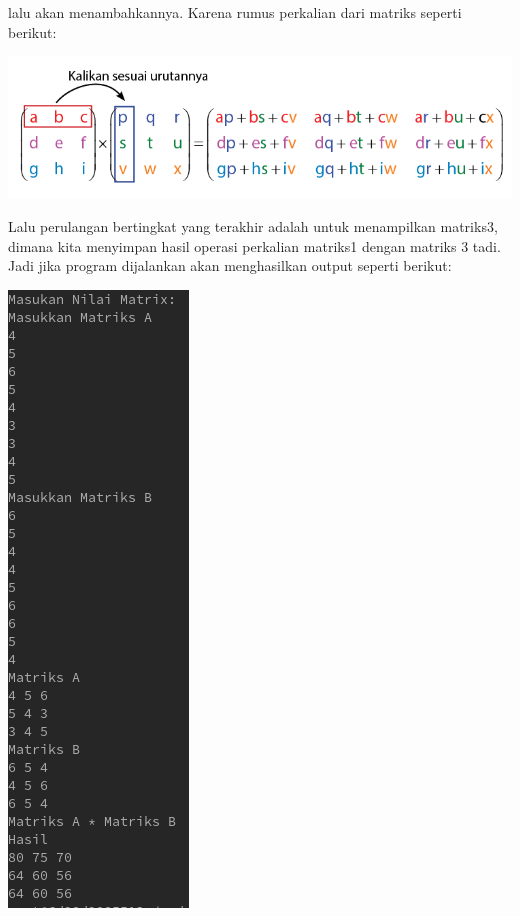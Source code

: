 \documentclass[a4paper,12pt]{article}
\begin{document}
lalu akan menambahkannya. Karena rumus perkalian dari matriks seperti berikut:
\begin{center}
    \includegraphics[width=\linewidth]{rumus.png}
\end{center}
Lalu perulangan bertingkat yang terakhir adalah untuk menampilkan matriks3, dimana kita menyimpan hasil operasi perkalian matriks1 dengan matriks 3 tadi. Jadi jika program dijalankan akan 
menghasilkan output seperti berikut:
\begin{center}
    \includegraphics{8.png}
\end{center}
\end{document}
